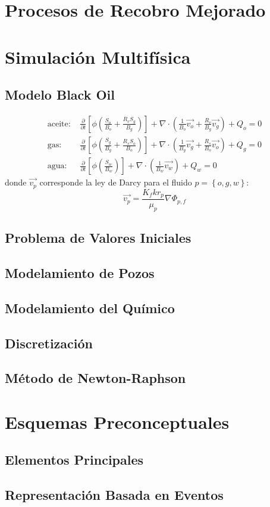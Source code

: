 \section{Procesos de Recobro Mejorado}

\section{Simulación Multifísica}
\subsection{Modelo Black Oil}

\begin{align}
\label{ec:aceite}
\text{aceite: }&\frac{\partial}{\partial t} \left[ \phi \left( \frac{S_{o}}{B_{o}} + \frac{R_{v} S_{g}}{B_{g}} \right) \right]
+ \nabla \cdot \left( \frac{1}{B_{o}} \vec{v_{o}} + \frac{R_{v}}{B_{g}} \vec{v_{g}} \right) + Q_{o} = 0 \\
\label{ec:gas}
\text{gas: }&\frac{\partial}{\partial t} \left[ \phi \left( \frac{S_{g}}{B_{g}} + \frac{R_{s} S_{o}}{B_{o}} \right) \right]
+ \nabla \cdot \left( \frac{1}{B_{g}} \vec{v_{g}} + \frac{R_{s}}{B_{o}} \vec{v_{o}} \right) + Q_{g} = 0\\
\label{ec:agua}
\text{agua: }&\frac{\partial}{\partial t} \left[\phi \left( \frac{S_{w}}{B_{w}} \right) \right] + \nabla \cdot \left( \frac{1}{B_{w}} \vec{v_{w}} \right) + Q_{w} = 0
\end{align}
donde $\vec{v_{p}}$ corresponde la ley de Darcy para el fluido $p = \left\lbrace o, g, w \right\rbrace $:
\begin{equation*}
\vec{v_{p}}=\frac{K_{f}kr_{p}}{\mu_{p} } \nabla{\Phi_{p,f}}
\end{equation*}
\subsection{Problema de Valores Iniciales}
%
\subsection{Modelamiento de Pozos}
%
\subsection{Modelamiento del Químico}
%
\subsection{Discretización}

\subsection{Método de Newton-Raphson}
%

\section{Esquemas Preconceptuales}

\subsection{Elementos Principales}

\subsection{Representación Basada en Eventos}